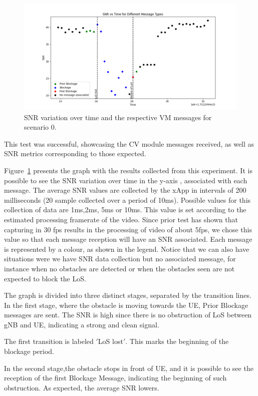 \begin{figure}[H]
    \centering
    \includegraphics[width=\linewidth]{figures/results_0}
    \caption{SNR variation over time and the respective VM messages for scenario 0.}
    \label{fig:results_0}
\end{figure}


This test was successful, showcasing the CV module messages received, as well as SNR metrics corresponding to those expected.

Figure~\ref{fig:results_0} presents the graph with the results collected from this experiment.
It is possible to see the SNR variation over time in the y-axis , associated with each message.
The average SNR values are collected by the xApp in intervals of 200 milliseconds (20 sample collected over a period of 10ms).
Possible values for this collection of data are 1ms,2ms, 5ms or 10ms.
This value is set according to the estimated processing framerate of the video.
Since prior test has shown that capturing in 30 fps results in the processing of video of about 5fps, we chose this value so that each message reception will have an SNR associated.
Each message is represented by a colour, as shown in the legend.
Notice that we can also have situations were we have SNR data collection but no associated message, for instance when no obstacles are detected or when the obstacles seen are not expected to block the LoS\@.

The graph is divided into three distinct stages, separated by the transition lines.
In the first stage, where the obstacle is moving towards the UE, Prior Blockage messages are sent.
The SNR is high  since there is no obstruction of LoS between gNB and UE, indicating a strong and clean signal.

The first transition is labeled \('\)LoS lost\('\).
This marks the beginning of the blockage period.

In the second stage,the obstacle stops in front of UE, and it is possible to see the reception of the first Blockage Message, indicating the beginning of such obstruction.
As expected, the average SNR lowers.

